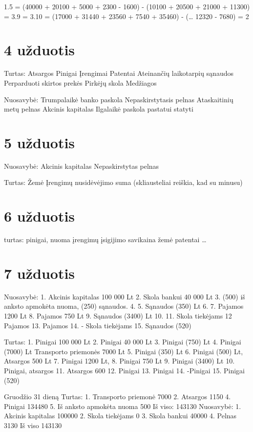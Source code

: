 1.5 = (40000 + 20100 + 5000 + 2300 - 1600) - (10100 + 20500 + 21000 + 11300) = 
3.9 = 3.10 = (17000 + 31440 + 23560 + 7540 + 35460) - (… 12320  - 7680) = 2 

\section{4 užduotis}

Turtas:
Atsargos
Pinigai
Įrengimai
Patentai
Ateinančių laikotarpių sąnaudos
Perparduoti skirtos prekės
Pirkėjų skola
Medžiagos

Nuosavybė:
Trumpalaikė banko paskola
Nepaskirstytasis pelnas
Ataskaitinių metų pelnas
Akcinis kapitalas
Ilgalaikė paskola pastatui statyti

\section{5 užduotis}

Nuosavybė:
Akcinis kapitalas
Nepaskirstytas pelnas

Turtas:
Žemė
Įrengimų nusidėvėjimo suma (skliausteliai reiškia, kad su minusu)

\section{6 užduotis}

turtas:
pinigai,
nuoma
įrengimų įsigijimo savikaina
žemė
patentai
…

\section{7 užduotis}

Nuosavybė:
1. Akcinis kapitalas 100 000 Lt
2. Skola bankui 40 000 Lt
3. (500) iš anksto apmokėta nuoma, (250) sąnaudos.
4.
5. Sąnaudos (350) Lt
6.
7. Pajamos 1200 Lt
8. Pajamos 750 Lt
9. Sąnaudos (3400) Lt
10.
11. Skola tiekėjams
12 Pajamos
13. Pajamos
14. - Skola tiekėjams
15. Sąnaudos (520)

Turtas:
1. Pinigai 100 000 Lt
2. Pinigai 40 000 Lt
3. Pinigai (750) Lt
4. Pinigai (7000) Lt Transporto priemonės 7000 Lt
5. Pinigai (350) Lt
6. Pinigai (500) Lt, Atsargos 500 Lt
7. Pinigai 1200 Lt,
8. Pinigai 750 Lt
9. Pinigai (3400) Lt
10. Pinigai, atsargos
11. Atsargos 600
12. Pinigai
13. Pinigai
14. -Pinigai
15. Pinigai (520)

Gruodžio 31 dieną
Turtas:
1. Transporto priemonė 7000
2. Atsargos 1150
4. Pinigai 134480
5. Iš anksto apmokėta nuoma 500
Iš viso: 143130
Nuosavybė:
1. Akcinis kapitalas 100000
2. Skola tiekėjams 0
3. Skola bankui 40000
4. Pelnas 3130
Iš viso 143130

